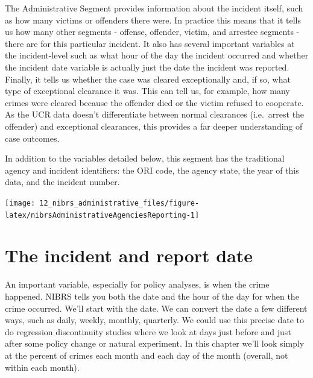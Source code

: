 \documentclass[
]{krantz}
\let\origfigure\figure
\let\endorigfigure\endfigure
\renewenvironment{figure}[1][2] {
    \expandafter\origfigure\expandafter[H]
} {
    \endorigfigure
}
\begin{document}
The Administrative Segment provides information about the
incident itself, such as how many victims or offenders there
were. In practice this means that it tells us how many other
segments - offense, offender, victim, and arrestee segments
- there are for this particular incident. It also has
several important variables at the incident-level such as
what hour of the day the incident occurred and whether the
incident date variable is actually just the date the
incident was reported. Finally, it tells us whether the case
was cleared exceptionally and, if so, what type of
exceptional clearance it was. This can tell us, for example,
how many crimes were cleared because the offender died or
the victim refused to cooperate. As the UCR data doesn't
differentiate between normal clearances (i.e.~arrest the
offender) and exceptional clearances, this provides a far
deeper understanding of case outcomes.

In addition to the variables detailed below, this segment
has the traditional agency and incident identifiers: the ORI
code, the agency state, the year of this data, and the
incident number.

\begin{figure}

{\centering \texttt{[image: 12\_nibrs\_administrative\_files/figure-latex/nibrsAdministrativeAgenciesReporting-1]} 

}

\caption{The annual number of agencies reporting data in the NIBRS Administrative Segment, 1991-2022.}\label{fig:nibrsAdministrativeAgenciesReporting}
\end{figure}

\section{The incident and report
date}\label{the-incident-and-report-date}

An important variable, especially for policy analyses, is
when the crime happened. NIBRS tells you both the date and
the hour of the day for when the crime occurred. We'll start
with the date. We can convert the date a few different ways,
such as daily, weekly, monthly, quarterly. We could use this
precise date to do regression discontinuity studies where we
look at days just before and just after some policy change
or natural experiment. In this chapter we'll look simply at
the percent of crimes each month and each day of the month
(overall, not within each month).
\end{document}
